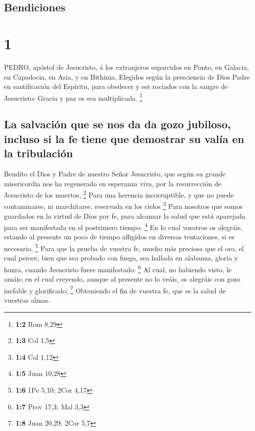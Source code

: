 \hypertarget{bendiciones}{%
\subsection{Bendiciones}\label{bendiciones}}

\hypertarget{section}{%
\section{1}\label{section}}

 PEDRO, apóstol de Jesucristo, á los extranjeros esparcidos
en Ponto, en Galacia, en Capadocia, en Asia, y en Bithinia, 
Elegidos según la presciencia de Dios Padre en santificación del
Espíritu, para obedecer y ser rociados con la sangre de Jesucristo:
Gracia y paz os sea multiplicada. \footnote{\textbf{1:2} Rom 8,29}

\hypertarget{la-salvaciuxf3n-que-se-nos-da-da-gozo-jubiloso-incluso-si-la-fe-tiene-que-demostrar-su-valuxeda-en-la-tribulaciuxf3n}{%
\subsection{La salvación que se nos da da gozo jubiloso, incluso si la
fe tiene que demostrar su valía en la
tribulación}\label{la-salvaciuxf3n-que-se-nos-da-da-gozo-jubiloso-incluso-si-la-fe-tiene-que-demostrar-su-valuxeda-en-la-tribulaciuxf3n}}

 Bendito el Dios y Padre de nuestro Señor Jesucristo, que
según su grande misericordia nos ha regenerado en esperanza viva, por la
resurrección de Jesucristo de los muertos, \footnote{\textbf{1:3} Col
  1,5}  Para una herencia incorruptible, y que no puede
contaminarse, ni marchitarse, reservada en los cielos \footnote{\textbf{1:4}
  Col 1,12}  Para nosotros que somos guardados en la virtud
de Dios por fe, para alcanzar la salud que está aparejada para ser
manifestada en el postrimero tiempo. \footnote{\textbf{1:5} Juan 10,28}
 En lo cual vosotros os alegráis, estando al presente un
poco de tiempo afligidos en diversas tentaciones, si es necesario,
\footnote{\textbf{1:6} 1Pe 5,10; 2Cor 4,17}  Para que la
prueba de vuestra fe, mucho más preciosa que el oro, el cual perece,
bien que sea probado con fuego, sea hallada en alabanza, gloria y honra,
cuando Jesucristo fuere manifestado: \footnote{\textbf{1:7} Prov 17,3;
  Mal 3,3}  Al cual, no habiendo visto, le amáis; en el cual
creyendo, aunque al presente no lo veáis, os alegráis con gozo inefable
y glorificado; \footnote{\textbf{1:8} Juan 20,29; 2Cor 5,7} 
Obteniendo el fin de vuestra fe, que es la salud de vuestras almas.

